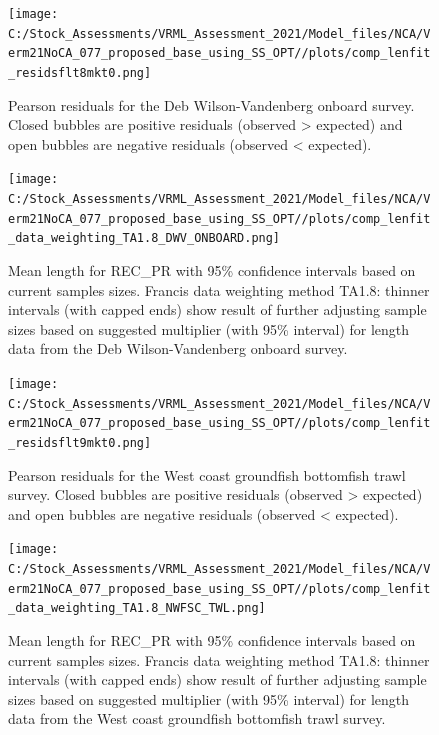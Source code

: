\documentclass[
  english,
  a4paper,
]{article}
\begin{document}
\begin{figure}
\centering
\texttt{[image: C:/Stock\_Assessments/VRML\_Assessment\_2021/Model\_files/NCA/Verm21NoCA\_077\_proposed\_base\_using\_SS\_OPT//plots/comp\_lenfit\_residsflt8mkt0.png]}
\caption{Pearson residuals for the Deb Wilson-Vandenberg onboard survey. Closed bubbles are positive residuals (observed \textgreater{} expected) and open bubbles are negative residuals (observed \textless{} expected).\label{fig:len-pearson-DWV-ONBOARD}}
\end{figure}

\begin{figure}
\centering
\texttt{[image: C:/Stock\_Assessments/VRML\_Assessment\_2021/Model\_files/NCA/Verm21NoCA\_077\_proposed\_base\_using\_SS\_OPT//plots/comp\_lenfit\_data\_weighting\_TA1.8\_DWV\_ONBOARD.png]}
\caption{Mean length for REC\_PR with 95\% confidence intervals based on current samples sizes. Francis data weighting method TA1.8: thinner intervals (with capped ends) show result of further adjusting sample sizes based on suggested multiplier (with 95\% interval) for length data from the Deb Wilson-Vandenberg onboard survey.\label{fig:mean-len-fit-DWV-ONBOARD}}
\end{figure}

\begin{figure}
\centering
\texttt{[image: C:/Stock\_Assessments/VRML\_Assessment\_2021/Model\_files/NCA/Verm21NoCA\_077\_proposed\_base\_using\_SS\_OPT//plots/comp\_lenfit\_residsflt9mkt0.png]}
\caption{Pearson residuals for the West coast groundfish bottomfish trawl survey. Closed bubbles are positive residuals (observed \textgreater{} expected) and open bubbles are negative residuals (observed \textless{} expected).\label{fig:len-pearson-NWFSC-TWL}}
\end{figure}

\begin{figure}
\centering
\texttt{[image: C:/Stock\_Assessments/VRML\_Assessment\_2021/Model\_files/NCA/Verm21NoCA\_077\_proposed\_base\_using\_SS\_OPT//plots/comp\_lenfit\_data\_weighting\_TA1.8\_NWFSC\_TWL.png]}
\caption{Mean length for REC\_PR with 95\% confidence intervals based on current samples sizes. Francis data weighting method TA1.8: thinner intervals (with capped ends) show result of further adjusting sample sizes based on suggested multiplier (with 95\% interval) for length data from the West coast groundfish bottomfish trawl survey.\label{fig:mean-len-fit-NWFSC-TWL}}
\end{figure}
\end{document}

